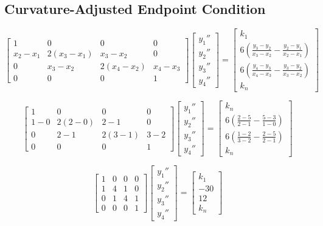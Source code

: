 \documentclass[11pt]{article} %
\begin{document}
\subsection*{Curvature-Adjusted Endpoint Condition}
$$\begin{bmatrix} 1 & 0 & 0 & 0 \\ x_2 - x_1 & 2(x_3 - x_1) & x_3 - x_2 & 0 
		 \\ 0 & x_3 - x_2 & 2(x_4 - x_2) & x_4 - x_3 \\ 0 & 0 & 0 & 1
\end{bmatrix}
\begin{bmatrix} y_1'' \\ y_2'' \\ y_3'' \\ y_4'' \end{bmatrix} = 
\begin{bmatrix} k_1 \\ 6\left( \frac{y_3 - y_2}{x_3 - x_2} - \frac{y_2-y_1}{x_2 - x_1} \right) \\ 
			 6\left( \frac{y_4 - y_3}{x_4 - x_3} - \frac{y_3-y_2}{x_3 - x_2} \right) \\ k_n\end{bmatrix}$$

$$\begin{bmatrix} 1 & 0 & 0 & 0 \\ 1 - 0 & 2(2 -0) &2 -1 & 0 
		 \\ 0 & 2 - 1 & 2(3 -1) & 3 - 2 \\ 0 & 0 & 0 & 1
\end{bmatrix}
\begin{bmatrix} y_1'' \\ y_2'' \\ y_3'' \\ y_4'' \end{bmatrix} = 
\begin{bmatrix} k_n \\  6\left( \frac{2 - 5}{2 - 1} - \frac{5-3}{1 - 0} \right) \\ 
			 6\left( \frac{1 - 2}{3 - 2} - \frac{2-5}{2 - 1} \right) \\ k_n\end{bmatrix}$$

$$\begin{bmatrix} 1 & 0 & 0 & 0 \\ 1 & 4 &1 & 0 
		 \\ 0 & 1 & 4 & 1 \\ 0 & 0 & 0 & 1
\end{bmatrix}
\begin{bmatrix} y_1'' \\ y_2'' \\ y_3'' \\ y_4'' \end{bmatrix} = 
\begin{bmatrix} k_1 \\ -30 \\ 12 \\ k_n\end{bmatrix}$$
\end{document}
